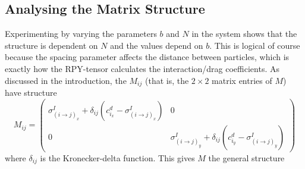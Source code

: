 \documentclass[paper=a4, fontsize=12pt]{scrartcl} %
\numberwithin{equation}{section}       %
\numberwithin{figure}{section}         %
\numberwithin{table}{section}          %
\begin{document}
\subsection{Analysing the Matrix Structure}
Experimenting by varying the parameters $b$ and $N$ in the system shows that the structure is dependent on $N$ and the values depend on $b$. This is logical of course because the spacing parameter affects the distance between particles, which is exactly how the RPY-tensor calculates the interaction/drag coefficients. As discussed in the introduction, the $M_{ij}$ (that is, the $2\times 2$ matrix entries of $M$) have structure 
$$M_{ij} = 
\begin{pmatrix}
 \sigma^I_{(i\rightarrow j)_{x}} + \delta_{ij}(c^d_{i_{x}} - \sigma^I_{(i\rightarrow j)_{x}}) & 0 \\
0 &  \sigma^I_{(i\rightarrow j)_{y}} + \delta_{ij}(c^d_{i_{y}} - \sigma^I_{(i\rightarrow j)_{y}})
\end{pmatrix}
$$
\noindent where $\delta_{ij}$ is the Kronecker-delta function. This gives $M$ the general structure
\end{document}
